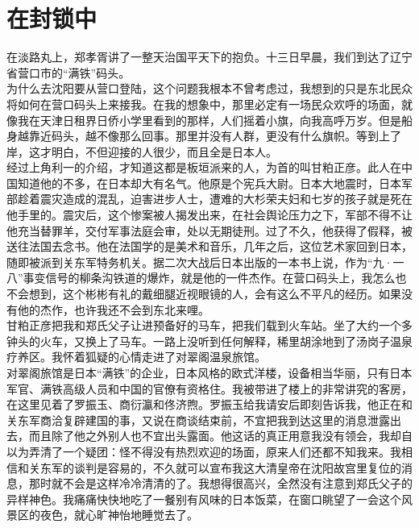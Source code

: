 \fancyhead[RO]{} %
\fancyhead[LE]{} %
\chapter*{在封锁中}
\thispagestyle{empty}
在淡路丸上，郑孝胥讲了一整天治国平天下的抱负。十三日早晨，我们到达了辽宁省营口市的“满铁”码头。\\

为什么去沈阳要从营口登陆，这个问题我根本不曾考虑过，我想到的只是东北民众将如何在营口码头上来接我。在我的想象中，那里必定有一场民众欢呼的场面，就像我在天津日租界日侨小学里看到的那样，人们摇着小旗，向我高呼万岁。但是船身越靠近码头，越不像那么回事。那里并没有人群，更没有什么旗帜。等到上了岸，这才明白，不但迎接的人很少，而且全是日本人。\\

经过上角利一的介绍，才知道这都是板垣派来的人，为首的叫甘粕正彦。此人在中国知道他的不多，在日本却大有名气。他原是个宪兵大尉。日本大地震时，日本军部趁着震灾造成的混乱，迫害进步人士，遭难的大杉荣夫妇和七岁的孩子就是死在他手里的。震灾后，这个惨案被人揭发出来，在社会舆论压力之下，军部不得不让他充当替罪羊，交付军事法庭会审，处以无期徒刑。过了不久，他获得了假释，被送往法国去念书。他在法国学的是美术和音乐，几年之后，这位艺术家回到日本，随即被派到关东军特务机关。据二次大战后日本出版的一本书上说，作为“九·一八”事变信号的柳条沟铁道的爆炸，就是他的一件杰作。在营口码头上，我怎么也不会想到，这个彬彬有礼的戴细腿近视眼镜的人，会有这么不平凡的经历。如果没有他的杰作，也许我还不会到东北来哩。\\

甘粕正彦把我和郑氏父子让进预备好的马车，把我们载到火车站。坐了大约一个多钟头的火车，又换上了马车。一路上没听到任何解释，稀里胡涂地到了汤岗子温泉疗养区。我怀着狐疑的心情走进了对翠阁温泉旅馆。\\

对翠阁旅馆是日本“满铁”的企业，日本风格的欧式洋楼，设备相当华丽，只有日本军官、满铁高级人员和中国的官僚有资格住。我被带进了楼上的非常讲究的客房，在这里见着了罗振玉、商衍瀛和佟济煦。罗振玉给我请安后即刻告诉我，他正在和关东军商洽复辟建国的事，又说在商谈结束前，不宜把我到达这里的消息泄露出去，而且除了他之外别人也不宜出头露面。他这话的真正用意我没有领会，我却自以为弄清了一个疑团：怪不得没有热烈欢迎的场面，原来人们还都不知我来。我相信和关东军的谈判是容易的，不久就可以宣布我这大清皇帝在沈阳故宫里复位的消息，那时就不会是这样冷冷清清的了。我想得很高兴，全然没有注意到郑氏父子的异样神色。我痛痛快快地吃了一餐别有风味的日本饭菜，在窗口眺望了一会这个风景区的夜色，就心旷神怡地睡觉去了。\\


